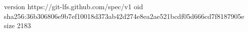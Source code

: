 version https://git-lfs.github.com/spec/v1
oid sha256:36b306806e9b7ef10018d373ab42d274e8ea2ae521bcdf05d666cd7f8187905e
size 2183
